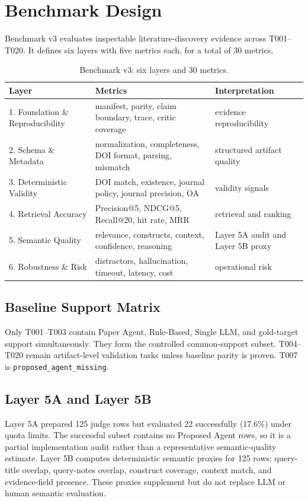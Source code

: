 \documentclass[10pt,twocolumn]{article}
\begin{document}
\section{Benchmark Design}
Benchmark v3 evaluates inspectable literature-discovery evidence across T001--T020. It defines six layers with five metrics each, for a total of 30 metrics.
\begin{table}[t]\centering\footnotesize
\begin{tabularx}{\textwidth}{l l X}\toprule
Layer & Metrics & Interpretation \\\midrule
1. Foundation \& Reproducibility & manifest, parity, claim boundary, trace, critic coverage & evidence reproducibility \\
2. Schema \& Metadata & normalization, completeness, DOI format, parsing, mismatch & structured artifact quality \\
3. Deterministic Validity & DOI match, existence, journal policy, journal precision, OA & validity signals \\
4. Retrieval Accuracy & Precision@5, NDCG@5, Recall@20, hit rate, MRR & retrieval and ranking \\
5. Semantic Quality & relevance, constructs, context, confidence, reasoning & Layer 5A audit and Layer 5B proxy \\
6. Robustness \& Risk & distractors, hallucination, timeout, latency, cost & operational risk \\
\bottomrule\end{tabularx}
\caption{Benchmark v3: six layers and 30 metrics.}\label{tab:v3layers}\end{table}

\subsection{Baseline Support Matrix}
Only T001--T003 contain Paper Agent, Rule-Based, Single LLM, and gold-target support simultaneously. They form the controlled common-support subset. T004--T020 remain artifact-level validation tasks unless baseline parity is proven. T007 is \texttt{proposed\_agent\_missing}.

\subsection{Layer 5A and Layer 5B}
Layer 5A prepared 125 judge rows but evaluated 22 successfully (17.6\%) under quota limits. The successful subset contains no Proposed Agent rows, so it is a partial implementation audit rather than a representative semantic-quality estimate. Layer 5B computes deterministic semantic proxies for 125 rows: query-title overlap, query-notes overlap, construct coverage, context match, and evidence-field presence. These proxies supplement but do not replace LLM or human semantic evaluation.
\end{document}
